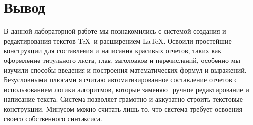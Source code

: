 \documentclass[10pt,a4paper]{report}
\begin{document}
\chapter{Вывод}
В данной лабораторной работе мы познакомились  с системой создания и редактирования текстов \TeX\ и расширением \LaTeX. Освоили простейшие конструкции для составления и написания красивых отчетов, таких как оформление титульного листа, глав, заголовков и перечислений, особенно мы изучили способы введения и построения математических формул и выражений. Безусловными плюсами я считаю автоматизированное составление отчетов с использованием логики алгоритмов, которые заменяют ручное редактирование и написание текста. Система позволяет грамотно и аккуратно строить текстовые конструкции. Минусом можно считать лишь то, что система требует освоения своего собственного синтаксиса.
\end{document}
